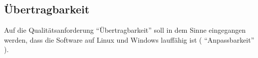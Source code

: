 \begin{flushleft}
\subsection{Übertragbarkeit} %
\label{sub:Übertragbarkeit}

Auf die Qualitätsanforderung ``Übertragbarkeit'' soll in dem Sinne eingegangen werden, dass die Software auf Linux und Windows lauffähig ist ( ``Anpassbarkeit'' ).


 
\end{flushleft}

